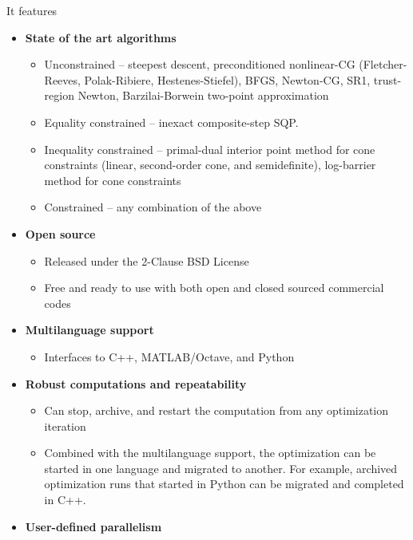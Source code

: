 \documentclass{report}
\begin{document}
\begin{center}
    \usebox{\boxOptimizationTypes}
\end{center}
\noindent It features 
\begin{itemize}
    \item {\bf State of the art algorithms}
        \begin{itemize}
            \item Unconstrained -- steepest descent, preconditioned nonlinear-CG (Fletcher-Reeves, Polak-Ribiere, Hestenes-Stiefel), BFGS, Newton-CG, SR1, trust-region Newton, Barzilai-Borwein two-point approximation
            \item Equality constrained -- inexact composite-step SQP.
            \item Inequality constrained -- primal-dual interior point method for cone constraints (linear, second-order cone, and semidefinite), log-barrier method for cone constraints
            \item Constrained -- any combination of the above
        \end{itemize}
    \item {\bf Open source}
        \begin{itemize}
            \item Released under the 2-Clause BSD License
            \item Free and ready to use with both open and closed sourced commercial codes
        \end{itemize}
    \item {\bf Multilanguage support}
        \begin{itemize}
            \item Interfaces to C++, MATLAB/Octave, and Python
        \end{itemize}
    \item {\bf Robust computations and repeatability}
        \begin{itemize}
            \item Can stop, archive, and restart the computation from any optimization iteration
            \item Combined with the multilanguage support, the optimization can be started in one language and migrated to another.  For example, archived optimization runs that started in Python can be migrated and completed in C++.
        \end{itemize}
    \item {\bf User-defined parallelism}
        \begin{itemize}

\end{itemize}
\end{itemize}
\end{document}
